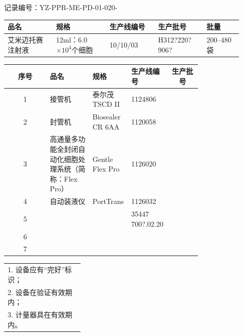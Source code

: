\documentclass[UTF8,10pt,a4paper,fontset=fandol]{ctexart}
\newcommand{\fieldvalue}[1]{#1}
\newcommand{\handwritten}[1]{#1}
\begin{document}
\noindent
记录编号：YZ-PPR-ME-PD-01-020-

\begin{tabular}{|p{0.19\linewidth}|p{0.21\linewidth}|p{0.19\linewidth}|p{0.19\linewidth}|p{0.14\linewidth}|}
\hline
\textbf{品名} & \textbf{规格} & \textbf{生产线编号} & \textbf{生产批号} & \textbf{批量} \\
\hline
艾米迈托赛注射液 & 12ml：6.0$\times 10^4$个细胞 &
\fieldvalue{\handwritten{10/10/03}} &
\fieldvalue{\handwritten{H312?220?906?}} &
200--480袋 \\
\hline
\end{tabular}

\vspace{2mm}

\begin{tabular}{|c|p{0.22\linewidth}|p{0.20\linewidth}|p{0.18\linewidth}|p{0.16\linewidth}|}
\hline
序号 & 品名 & 规格 & 生产线编号 & \multicolumn{1}{c|}{生产批号} \\
\hline
1 & 接管机 & 泰尔茂 TSCD II &
\fieldvalue{\handwritten{1124806}} &
\\
\hline
2 & 封管机 & Biosealer CR 6AA &
\fieldvalue{\handwritten{1120058}} &
\\
\hline
3 & 高通量多功能全封闭自动化细胞处理系统（简称：Flex Pro） & Gentle Flex Pro &
\fieldvalue{\handwritten{1126020}} &
\\
\hline
4 & 自动装液仪 & PortTrans &
\fieldvalue{\handwritten{1126032}} &
\\
\hline
5 & & &
\fieldvalue{\handwritten{35447 700?.02.20}} &
\\
\hline
6 & & & & \\
\hline
7 & & & & \\
\hline
\end{tabular}
\hspace{2mm}
\begin{tabular}{|p{0.30\linewidth}|}
\hline
1. 设备应有“完好”标识；\\
2. 设备在验证有效期内；\\
3. 计量器具在有效期内。\\
\hline
\end{tabular}
\end{document}
